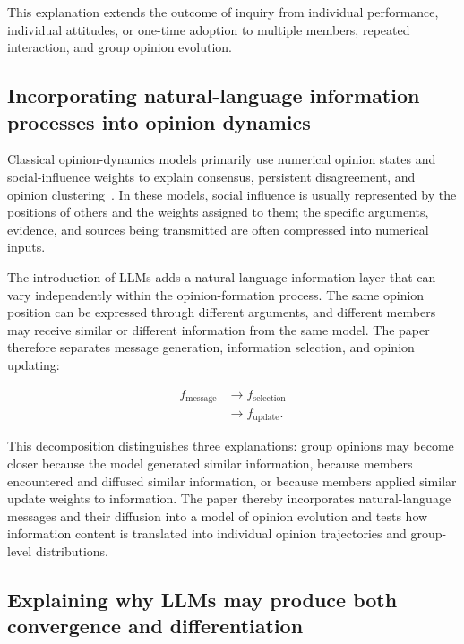 \documentclass[11pt,a4paper]{article}
\begin{document}
This explanation extends the outcome of inquiry from individual performance, individual attitudes, or one-time adoption to multiple members, repeated interaction, and group opinion evolution.

\subsection{Incorporating natural-language information processes into opinion dynamics}

Classical opinion-dynamics models primarily use numerical opinion states and social-influence weights to explain consensus, persistent disagreement, and opinion clustering~\citep{degroot1974,friedkin1990,hegselmann2002}. In these models, social influence is usually represented by the positions of others and the weights assigned to them; the specific arguments, evidence, and sources being transmitted are often compressed into numerical inputs.

The introduction of LLMs adds a natural-language information layer that can vary independently within the opinion-formation process. The same opinion position can be expressed through different arguments, and different members may receive similar or different information from the same model. The paper therefore separates message generation, information selection, and opinion updating:

\begin{equation*}
\begin{aligned}f_{\text{message}} &\rightarrow f_{\text{selection}} \\
&\rightarrow f_{\text{update}}.\end{aligned}
\end{equation*}

This decomposition distinguishes three explanations: group opinions may become closer because the model generated similar information, because members encountered and diffused similar information, or because members applied similar update weights to information. The paper thereby incorporates natural-language messages and their diffusion into a model of opinion evolution and tests how information content is translated into individual opinion trajectories and group-level distributions.

\subsection{Explaining why LLMs may produce both convergence and differentiation}
\end{document}
